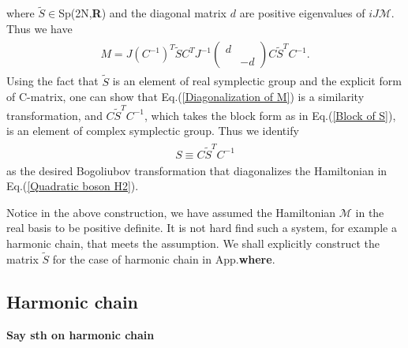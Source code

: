 where $\tilde{S}\in$Sp(2N,{\bf R}) and the diagonal matrix $d$ are positive eigenvalues of $iJ\mathcal{M}$. Thus we have
\begin{eqnarray}\begin{aligned}
\label{Diagonalization of M}
M=J(C^{-1})^T\tilde{S}C^TJ^{-1}\left(\begin{array}{ccc}
d\\
&-d
\end{array}\right)C\tilde{S}^TC^{-1}.
\end{aligned}\end{eqnarray}
Using the fact that $\tilde{S}$ is an element of real symplectic group and the explicit form of C-matrix, one can show that Eq.(\ref{Diagonalization of M}) is a similarity transformation, and $C\tilde{S}^TC^{-1}$, which takes the block form as in Eq.(\ref{Block of S}), is an element of complex symplectic group. Thus we identify 
\begin{eqnarray*}\begin{aligned}
S\equiv C\tilde{S}^TC^{-1}
\end{aligned}\end{eqnarray*}
as the desired Bogoliubov transformation that diagonalizes the Hamiltonian in Eq.(\ref{Quadratic boson H2}). 

Notice in the above construction, we have assumed the Hamiltonian $\mathcal{M}$ in the real basis to be positive definite. It is not hard find such a system, for example a harmonic chain, that meets the assumption. We shall explicitly construct the matrix $\tilde{S}$ for the case of harmonic chain in App.{\bf\color{red}where}.
\subsection{Harmonic chain}

{\bf\color{red}Say sth on harmonic chain}

